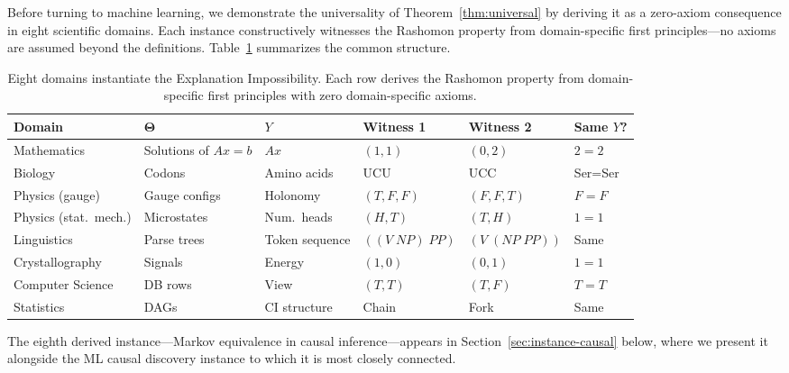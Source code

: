 \documentclass[11pt,a4paper]{article}
\newcommand{\Params}{\mathbf{\Theta}}
\begin{document}
Before turning to machine learning, we demonstrate the universality of
Theorem~\ref{thm:universal} by deriving it as a zero-axiom consequence in
eight scientific domains.  Each instance constructively witnesses the Rashomon
property from domain-specific first principles---no axioms are assumed beyond
the definitions.  Table~\ref{tab:unification} summarizes the common structure.

\begin{table}[t]
\centering
\caption{Eight domains instantiate the Explanation Impossibility. Each row derives the Rashomon property from domain-specific first principles with zero domain-specific axioms.}
\label{tab:unification}
\begin{tabular}{llllll}
\toprule
Domain & $\Params$ & $Y$ & Witness 1 & Witness 2 & Same $Y$? \\
\midrule
Mathematics & Solutions of $Ax=b$ & $Ax$ & $(1,1)$ & $(0,2)$ & $2=2$ \\
Biology & Codons & Amino acids & UCU & UCC & Ser=Ser \\
Physics (gauge) & Gauge configs & Holonomy & $(T,F,F)$ & $(F,F,T)$ & $F=F$ \\
Physics (stat.\ mech.) & Microstates & Num.\ heads & $(H,T)$ & $(T,H)$ & $1=1$ \\
Linguistics & Parse trees & Token sequence & $((V\;NP)\;PP)$ & $(V\;(NP\;PP))$ & Same \\
Crystallography & Signals & Energy & $(1,0)$ & $(0,1)$ & $1=1$ \\
Computer Science & DB rows & View & $(T,T)$ & $(T,F)$ & $T=T$ \\
Statistics & DAGs & CI structure & Chain & Fork & Same \\
\bottomrule
\end{tabular}
\end{table}















The eighth derived instance---Markov equivalence in causal inference---appears
in Section~\ref{sec:instance-causal} below, where we present it alongside
the ML causal discovery instance to which it is most closely connected.
\end{document}

